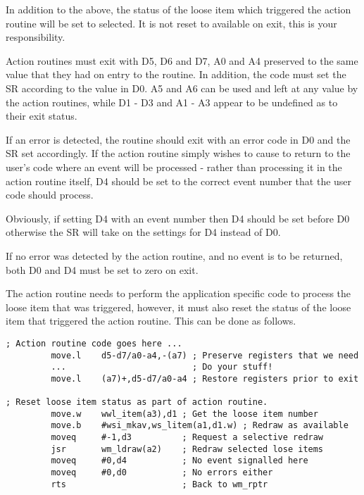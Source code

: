 In addition to the above, the status of the loose item which
    triggered the action routine will be set to selected. It is not reset to
    available on exit, this is your responsibility.

Action routines must exit with D5, D6 and D7, A0 and A4 preserved to
    the same value that they had on entry to the routine. In addition, the
    code must set the SR according to the value in D0. A5 and A6 can be used
    and left at any value by the action routines, while D1 -{} D3 and A1 -{} A3
    appear to be undefined as to their exit status.

If an error is detected, the routine should exit with an error code
    in D0 and the SR set accordingly. If the action routine simply wishes to
    cause  to return to the user's code where an event will be
    processed -{} rather than processing it in the action routine itself, D4
    should be set to the correct event number that the user code should
    process.

Obviously, if setting D4 with an event number then D4 should be set
    before D0 otherwise the SR will take on the settings for D4 instead of
    D0.

If no error was detected by the action routine, and no event is to
    be returned, both D0 and D4 must be set to zero on exit.

The action routine needs to perform the application specific code to
    process the loose item that was triggered, however, it must also reset the
    status of the loose item that triggered the action routine. This can be
    done as follows.

\begin{lstlisting}[firstnumber=last,caption={EasyPEasy Standard Code - Actions},label={lst:EasyPEasy-10}]
; Action routine code goes here ...
         move.l    d5-d7/a0-a4,-(a7) ; Preserve registers that we need
         ...                         ; Do your stuff!
         move.l    (a7)+,d5-d7/a0-a4 ; Restore registers prior to exit
      
; Reset loose item status as part of action routine.
         move.w    wwl_item(a3),d1 ; Get the loose item number
         move.b    #wsi_mkav,ws_litem(a1,d1.w) ; Redraw as available
         moveq     #-1,d3          ; Request a selective redraw
         jsr       wm_ldraw(a2)    ; Redraw selected lose items
         moveq     #0,d4           ; No event signalled here
         moveq     #0,d0           ; No errors either
         rts                       ; Back to wm_rptr
\end{lstlisting}

